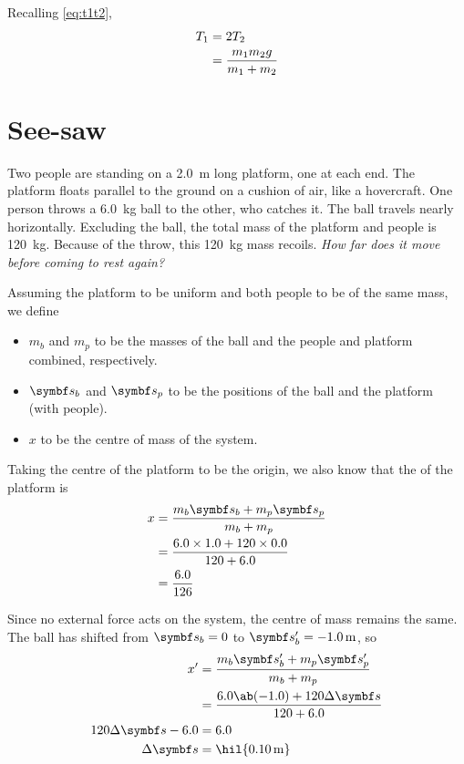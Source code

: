 Recalling \cref{eq:t1t2},
\begin{align*}
  T_1 &= 2T_2 \\
  &= \frac{m_1m_2g}{m_1+m_2}
\end{align*}

\section{See-saw}
Two people are standing on a \qty{2.0}{\metre} long platform, one at
each end. The platform floats parallel
to the ground on a cushion of air, like a hovercraft. One person
throws a \qty{6.0}{\kg} ball
to the other, who catches it. The ball travels nearly horizontally.
Excluding the ball, the total mass of the platform and people is \qty{120}{\kg}.
Because of the throw, this \qty{120}{\kg} mass recoils. \it{How far
does it move before coming to rest again?}

Assuming the platform to be uniform and both people to be of the same
mass, we define
\begin{itemize}
  \item \(m_b\) and \(m_p\) to be the masses of the ball and the
    people and platform combined, respectively.
  \item \(\mv{s}_b\) and \(\mv{s}_p\) to be the positions of the ball
    and the platform (with people).
  \item \(x\) to be the centre of mass of the system.
\end{itemize}

Taking the centre of the platform to be the origin,
we also know that the  of the platform is
\begin{align*}
  x &= \f{m_b \mv{s}_b + m_p \mv{s}_p}{m_b + m_p} \\
  &= \f{6.0 \times 1.0 + 120 \times 0.0}{120 + 6.0} \\
  &= \f{6.0}{126}
\end{align*}

Since no external force acts on the system, the centre of mass remains the same.
The ball has shifted from \(\mv{s}_b = 0\) to \(\mv{s}_b' =
\qty{-1.0}{\metre}\), so
\begin{align*}
  x' &= \f{m_b \mv{s}_b' + m_p \mv{s}_p'}{m_b + m_p} \\
  &= \f{6.0\ab(-1.0) + 120\Delta\mv{s}}{120 + 6.0} \\
  120\Delta\mv{s} - 6.0 &= 6.0 \\
  \Delta\mv{s} &= \hil{\qty{+0.10}{\metre}}
\end{align*}


